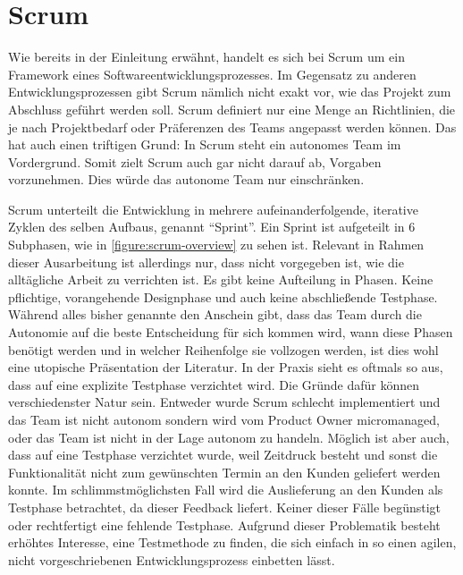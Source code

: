 \documentclass[12pt,DIV14,BCOR10mm,a4paper,twoside,parskip=half-,headsepline,headinclude,english,ngerman,bibliography=totocnumbered]{scrreprt}
\begin{document}
\chapter{Scrum}

Wie bereits in der Einleitung erwähnt, handelt es sich bei Scrum um ein Framework eines Softwareentwicklungsprozesses.
Im Gegensatz zu anderen Entwicklungsprozessen gibt Scrum nämlich nicht exakt vor, wie das Projekt zum Abschluss geführt werden soll.
Scrum definiert nur eine Menge an Richtlinien, die je nach Projektbedarf oder Präferenzen des Teams angepasst werden können.
Das hat auch einen triftigen Grund: In Scrum steht ein autonomes Team im Vordergrund.
Somit zielt Scrum auch gar nicht darauf ab, Vorgaben vorzunehmen.
Dies würde das autonome Team nur einschränken.

Scrum unterteilt die Entwicklung in mehrere aufeinanderfolgende, iterative Zyklen des selben Aufbaus, genannt \enquote{Sprint}.
Ein Sprint ist aufgeteilt in 6 Subphasen, wie in \ref{figure:scrum-overview} zu sehen ist.
Relevant in Rahmen dieser Ausarbeitung ist allerdings nur, dass nicht vorgegeben ist, wie die alltägliche Arbeit zu verrichten ist.
Es gibt keine Aufteilung in Phasen.
Keine pflichtige, vorangehende Designphase und auch keine abschließende Testphase.
Während alles bisher genannte den Anschein gibt, dass das Team durch die Autonomie auf die beste Entscheidung für sich kommen wird, wann diese Phasen benötigt werden und in welcher Reihenfolge sie vollzogen werden, ist dies wohl eine utopische Präsentation der Literatur.
In der Praxis sieht es oftmals so aus, dass auf eine explizite Testphase verzichtet wird.
Die Gründe dafür können verschiedenster Natur sein.
Entweder wurde Scrum schlecht implementiert und das Team ist nicht autonom sondern wird vom Product Owner micromanaged, oder das Team ist nicht in der Lage autonom zu handeln.
Möglich ist aber auch, dass auf eine Testphase verzichtet wurde, weil Zeitdruck besteht und sonst die Funktionalität nicht zum gewünschten Termin an den Kunden geliefert werden konnte.
Im schlimmstmöglichsten Fall wird die Auslieferung an den Kunden als Testphase betrachtet, da dieser Feedback liefert.
Keiner dieser Fälle begünstigt oder rechtfertigt eine fehlende Testphase.
Aufgrund dieser Problematik besteht erhöhtes Interesse, eine Testmethode zu finden, die sich einfach in so einen agilen, nicht vorgeschriebenen Entwicklungsprozess einbetten lässt.
\end{document}
